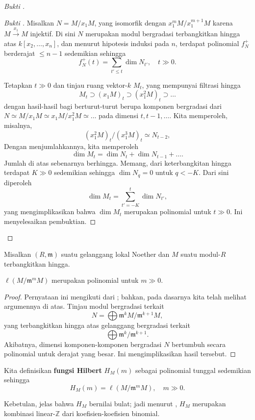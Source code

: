 \begin{proof}[Bukti ]
\begin{proof}[Bukti ]
Misalkan $N = M/x_1 M $, yang isomorfik dengan $ x_1^m M/x_1^{m+1} M$ karena $M \stackrel{x_1}{\to} M$
injektif. Di sini $N$ merupakan modul bergradasi terbangkitkan hingga atas $k[x_2, \dots, x_n]$, dan menurut
hipotesis induksi pada $n$, terdapat polinomial $f_N^+$ berderajat $\leq n-1$ sedemikian sehingga
\[ f_N^+(t) = \sum_{t' \leq t} \dim N_{t'}, \quad t \gg 0.  \]

Tetapkan $t \gg 0$ dan tinjau ruang vektor-$k$ $M_t$, yang mempunyai filtrasi hingga 
\[ M_t \supset (x_1 M)_t \supset (x_1^2 M)_t \supset \dots  \]
dengan hasil-hasil bagi berturut-turut berupa komponen bergradasi dari $N \simeq
M/x_1 M \simeq x_1 M/x_1^2 M \simeq \dots$ pada dimensi $t, t-1, \dots$. Kita
memperoleh, misalnya,
\[ (x_1^2 M)_t/(x_1^3 M)_t \simeq N_{t-2},  \]
Dengan menjumlahkannya, kita memperoleh
\[ \dim M_t = \dim N_t + \dim N_{t-1} + \dots . \]
Jumlah di atas sebenarnya berhingga. Memang, dari keterbangkitan hingga terdapat $K
\gg 0 $ sedemikian sehingga $\dim N_q  = 0$ untuk $q< -K$. Dari sini diperoleh 
\[ \dim M_t = \sum_{t' = -K}^{t} \dim N_{t'},  \]
yang mengimplikasikan bahwa $\dim M_t$ merupakan polinomial untuk $t \gg 0$. Ini menyelesaikan
pembuktian.
\end{proof} 
\end{proof}


Misalkan $(R, \mathfrak{m})$ suatu gelanggang lokal Noether dan $M$ suatu modul-$R$
terbangkitkan hingga. 
\begin{proposition} \label{hilbertlocalring} 
$\ell(M/\mathfrak{m}^m M)$ merupakan polinomial untuk $m \gg 0$. 
\end{proposition} 
\begin{proof} 
Pernyataan ini mengikuti dari ; bahkan, pada dasarnya kita telah
melihat argumennya di atas. Tinjau
modul bergradasi terkait
\[ N = \bigoplus \mathfrak{m}^k M/\mathfrak{m}^{k+1}M , \]
yang terbangkitkan hingga atas gelanggang bergradasi terkait
\[ \bigoplus \mathfrak{m}^k/\mathfrak{m}^{k+1}.  \]
Akibatnya, dimensi komponen-komponen bergradasi $N$ bertumbuh secara polinomial
untuk derajat yang besar. Ini mengimplikasikan hasil tersebut. 

\end{proof} 
\begin{definition} 
Kita definisikan \textbf{fungsi Hilbert} $H_M(m)$ sebagai polinomial tunggal
sedemikian sehingga 
\[ H_M(m) = \ell(M/ \mathfrak{m}^m M), \quad m \gg 0.  \]
\end{definition} 

Kebetulan, jelas bahwa $H_M$ bernilai bulat; jadi menurut
, $H_M$ merupakan kombinasi linear-$\mathbb{Z}$
dari koefisien-koefisien binomial.

